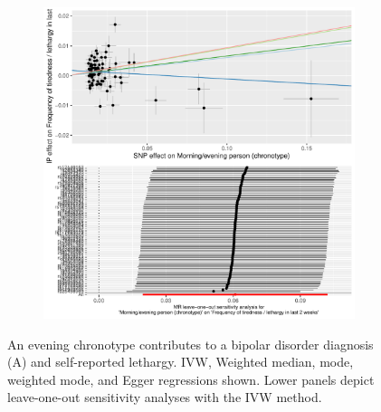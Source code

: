 \documentclass[journal,article,submit,moreauthors,pdftex]{Definitions/mdpi}
\begin{document}
\begin{figure}[htbp]
\begin{subfigure}[b]{0.4\textwidth}
         \includegraphics[width=\textwidth]{Figs/Analysis2/Morning_evening_person_(chronotype)_vs_Frequency_of_tiredness___lethargy_in_last_2_weeks.Plots.pdf}
         \caption{}
         \label{beer}
     \end{subfigure}
        \caption{An evening chronotype contributes to a bipolar disorder diagnosis (A) and self-reported lethargy. IVW, Weighted median, mode, weighted mode, and Egger regressions shown. Lower panels depict leave-one-out sensitivity analyses with the IVW method.}
        \label{bplethargy}
\end{figure}
\end{document}
